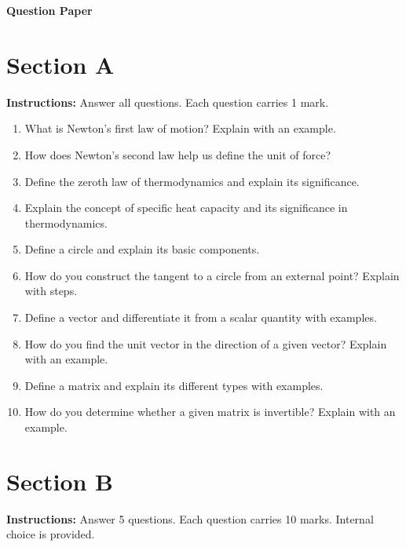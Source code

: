 \documentclass[a4paper,12pt]{article}
\begin{document}
\begin{center}
    {\LARGE \textbf{Question Paper}}
\end{center}

\section*{Section A}
\textbf{Instructions:} Answer all questions. Each question carries 1 mark.\\

\begin{enumerate}
    \item What is Newton’s first law of motion? Explain with an example.
    \item How does Newton’s second law help us define the unit of force?
    \item Define the zeroth law of thermodynamics and explain its significance.
    \item Explain the concept of specific heat capacity and its significance in thermodynamics.
    \item Define a circle and explain its basic components.
    \item How do you construct the tangent to a circle from an external point? Explain with steps.
    \item Define a vector and differentiate it from a scalar quantity with examples.
    \item How do you find the unit vector in the direction of a given vector? Explain with an 
example.
    \item Define a matrix and explain its different types with examples.
    \item How do you determine whether a given matrix is invertible? Explain with an example.
\end{enumerate}

\section*{Section B}
\textbf{Instructions:} Answer 5 questions. Each question carries 10 marks. Internal choice is provided.\\
\end{document}
